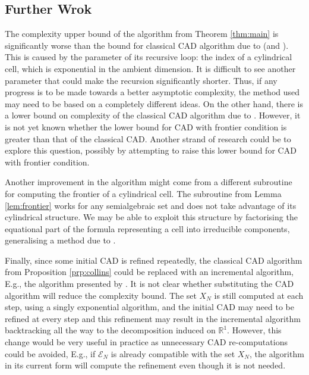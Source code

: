 \documentclass[
]{book}
\theoremstyle{definition}
\theoremstyle{definition}
\theoremstyle{definition}
\theoremstyle{definition}
\theoremstyle{remark}
\begin{document}
\hypertarget{further-wrok}{%
\subsection{Further Wrok}\label{further-wrok}}

The complexity upper bound of the algorithm from Theorem \ref{thm:main} is significantly worse than the bound
for classical CAD algorithm due to \citet{collins1975} (and \citet{wuthrich1976}).
This is caused by the parameter of its recursive loop: the index of a cylindrical cell, which is exponential in the ambient dimension.
It is difficult to see another parameter that could make the recursion significantly shorter. Thus, if any progress is to be made towards a better asymptotic complexity, the method used may need to be based on a completely different ideas.
On the other hand, there is a lower bound on complexity of the classical CAD algorithm due to \citet{davenportHeintz1988}. However, it is not yet known whether the lower bound for CAD with frontier condition is greater than that of the classical CAD.
Another strand of research could be to explore this question, possibly by attempting to raise this lower bound for CAD with frontier condition.

Another improvement in the algorithm might come from a different subroutine for computing the frontier
of a cylindrical cell.
The subroutine from Lemma \ref{lem:frontier} works for any semialgebraic set and does not take advantage of its
cylindrical structure.
We may be able to exploit this structure by factorising the equational part of the formula
representing a cell into irreducible components, generalising a method due to \citet{lazard10}.

Finally, since some initial CAD is refined repeatedly, the classical CAD algorithm from Proposition \ref{prp:collins} could be replaced with an incremental algorithm, E.g., the algorithm presented by \citet{kremer2020}. It is not clear whether substituting the CAD algorithm will reduce the complexity bound. The set \(X_N\) is still computed at each step, using a singly exponential algorithm, and the initial CAD may need to be refined at every step and this refinement may result in the incremental algorithm backtracking all the way to the decomposition induced on \(\mathbb{R}^1\). However, this change would be very useful in practice as unnecessary CAD re-computations could be avoided, E.g., if \(\mathcal{E}_N\) is already compatible with the set \(X_N\), the algorithm in its current form will compute the refinement even though it is not needed.
\end{document}
